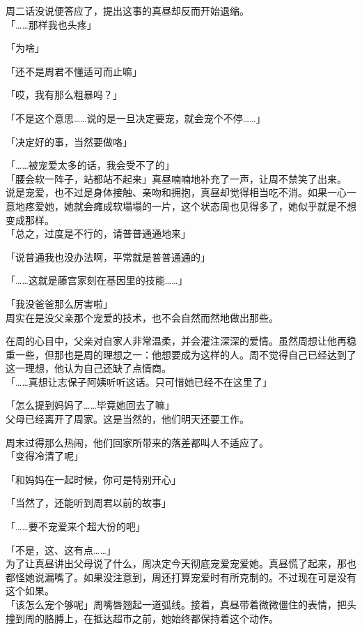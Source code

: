 周二话没说便答应了，提出这事的真昼却反而开始退缩。\\

「……那样我也头疼」

「为啥」

「还不是周君不懂适可而止嘛」

「哎，我有那么粗暴吗？」

「不是这个意思……说的是一旦决定要宠，就会宠个不停……」

「决定好的事，当然要做咯」

「……被宠爱太多的话，我会受不了的」\\

「腰会软一阵子，站都站不起来」真昼喃喃地补充了一声，让周不禁笑了出来。\\

说是宠爱，也不过是身体接触、亲吻和拥抱，真昼却觉得相当吃不消。如果一心一意地疼爱她，她就会瘫成软塌塌的一片，这个状态周也见得多了，她似乎就是不想变成那样。\\

「总之，过度是不行的，请普普通通地来」

「说普通我也没办法啊，平常就是普普通通的」

「……这就是藤宫家刻在基因里的技能……」

「我没爸爸那么厉害啦」\\

周实在是没父亲那个宠爱的技术，也不会自然而然地做出那些。

在周的心目中，父亲对自家人非常温柔，并会灌注深深的爱情。虽然周想让他再稳重一些，但那也是周的理想之一：他想要成为这样的人。周不觉得自己已经达到了这一理想，他认为自己还缺了点情商。\\

「……真想让志保子阿姨听听这话。只可惜她已经不在这里了」

「怎么提到妈妈了……毕竟她回去了嘛」\\

父母已经离开了周家。这是当然的，他们明天还要工作。

周末过得那么热闹，他们回家所带来的落差都叫人不适应了。\\

「变得冷清了呢」

「和妈妈在一起时候，你可是特别开心」

「当然了，还能听到周君以前的故事」

「……要不宠爱来个超大份的吧」

「不是，这、这有点……」\\

为了让真昼讲出父母说了什么，周决定今天彻底宠爱宠爱她。真昼慌了起来，那也都怪她说漏嘴了。如果没注意到，周还打算宠爱时有所克制的。不过现在可是没有这个如果。\\

「该怎么宠个够呢」周嘴唇翘起一道弧线。接着，真昼带着微微僵住的表情，把头撞到周的胳膊上，在抵达超市之前，她始终都保持着这个动作。

